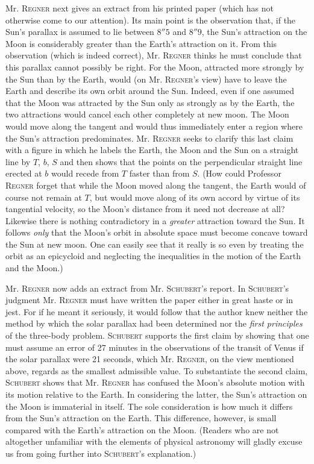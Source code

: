 Mr. \textsc{Regner} next gives an extract from his printed paper (which has not otherwise come to our attention). Its main point is the observation that, if the Sun's parallax is assumed to lie between $8''5$ and $8''9$, the Sun's attraction on the Moon is considerably greater than the Earth's attraction on it. From this observation (which is indeed correct), Mr. \textsc{Regner} thinks he must conclude that this parallax cannot possibly be right. For the Moon, attracted more strongly by the Sun than by the Earth, would (on Mr. \textsc{Regner}'s view) have to leave the Earth and describe its own orbit around the Sun. Indeed, even if one assumed that the Moon was attracted by the Sun only as strongly as by the Earth, the two attractions would cancel each other completely at new moon. The Moon would move along the tangent and would thus immediately enter a region where the Sun's attraction predominates. Mr. \textsc{Regner} seeks to clarify this last claim with a figure in which he labels the Earth, the Moon and the Sun on a straight line by $T$, $b$, $S$ and then shows that the points on the perpendicular straight line erected at $b$ would recede from $T$ faster than from $S$. (How could Professor \textsc{Regner} forget that while the Moon moved along the tangent, the Earth would of course not remain at $T$, but would move along of its own accord by virtue of its tangential velocity, so the Moon's distance from it need not decrease at all? Likewise there is nothing contradictory in a \emph{greater} attraction toward the Sun. It follows \emph{only} that the Moon's orbit in absolute space must become concave toward the Sun at new moon. One can easily see that it really is so even by treating the orbit as an epicycloid and neglecting the inequalities in the motion of the Earth and the Moon.)

Mr. \textsc{Regner} now adds an extract from Mr. \textsc{Schubert}'s report. In \textsc{Schubert}'s judgment Mr. \textsc{Regner} must have written the paper either in great haste or in jest. For if he meant it seriously, it would follow that the author knew neither the method by which the solar parallax had been determined nor the \emph{first principles} of the three-body problem. \textsc{Schubert} supports the first claim by showing that one must assume an error of 27 minutes in the observations of the transit of Venus if the solar parallax were 21 seconds, which Mr. \textsc{Regner}, on the view mentioned above, regards as the smallest admissible value. To substantiate the second claim, \textsc{Schubert} shows that Mr. \textsc{Regner} has confused the Moon's absolute motion with its motion relative to the Earth. In considering the latter, the Sun's attraction on the Moon is immaterial in itself. The sole consideration is how much it differs from the Sun's attraction on the Earth. This difference, however, is small compared with the Earth's attraction on the Moon. (Readers who are not altogether unfamiliar with the elements of physical astronomy will gladly excuse us from going further into \textsc{Schubert}'s explanation.)

